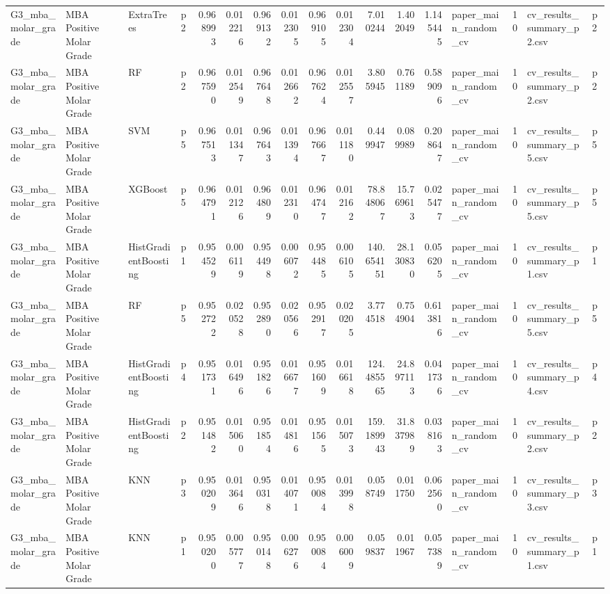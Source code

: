 \begin{tabular}{llllrrrrrrrrrlrll}
G3_mba_molar_grade & MBA Positive Molar Grade & ExtraTrees & p2 & 0.968993 & 0.012216 & 0.969132 & 0.012305 & 0.969105 & 0.012304 & 7.010244 & 1.402049 & 1.145445 & paper_main_random_cv & 10 & cv_results_summary_p2.csv & p2 \\
G3_mba_molar_grade & MBA Positive Molar Grade & RF & p2 & 0.967590 & 0.012549 & 0.967648 & 0.012662 & 0.967624 & 0.012557 & 3.805945 & 0.761189 & 0.589096 & paper_main_random_cv & 10 & cv_results_summary_p2.csv & p2 \\
G3_mba_molar_grade & MBA Positive Molar Grade & SVM & p5 & 0.967513 & 0.011347 & 0.967643 & 0.011394 & 0.967667 & 0.011180 & 0.449947 & 0.089989 & 0.208647 & paper_main_random_cv & 10 & cv_results_summary_p5.csv & p5 \\
G3_mba_molar_grade & MBA Positive Molar Grade & XGBoost & p5 & 0.964791 & 0.012126 & 0.964809 & 0.012310 & 0.964747 & 0.012162 & 78.848067 & 15.769613 & 0.025477 & paper_main_random_cv & 10 & cv_results_summary_p5.csv & p5 \\
G3_mba_molar_grade & MBA Positive Molar Grade & HistGradientBoosting & p1 & 0.954529 & 0.006119 & 0.954498 & 0.006072 & 0.954485 & 0.006105 & 140.654151 & 28.130830 & 0.056205 & paper_main_random_cv & 10 & cv_results_summary_p1.csv & p1 \\
G3_mba_molar_grade & MBA Positive Molar Grade & RF & p5 & 0.952722 & 0.020528 & 0.952890 & 0.020566 & 0.952917 & 0.020205 & 3.774518 & 0.754904 & 0.613816 & paper_main_random_cv & 10 & cv_results_summary_p5.csv & p5 \\
G3_mba_molar_grade & MBA Positive Molar Grade & HistGradientBoosting & p4 & 0.951731 & 0.016496 & 0.951826 & 0.016677 & 0.951609 & 0.016618 & 124.485565 & 24.897113 & 0.041736 & paper_main_random_cv & 10 & cv_results_summary_p4.csv & p4 \\
G3_mba_molar_grade & MBA Positive Molar Grade & HistGradientBoosting & p2 & 0.951482 & 0.015060 & 0.951854 & 0.014816 & 0.951565 & 0.015073 & 159.189943 & 31.837989 & 0.038163 & paper_main_random_cv & 10 & cv_results_summary_p2.csv & p2 \\
G3_mba_molar_grade & MBA Positive Molar Grade & KNN & p3 & 0.950209 & 0.013646 & 0.950318 & 0.014071 & 0.950084 & 0.013998 & 0.058749 & 0.011750 & 0.062560 & paper_main_random_cv & 10 & cv_results_summary_p3.csv & p3 \\
G3_mba_molar_grade & MBA Positive Molar Grade & KNN & p1 & 0.950200 & 0.005777 & 0.950148 & 0.006276 & 0.950084 & 0.006009 & 0.059837 & 0.011967 & 0.057389 & paper_main_random_cv & 10 & cv_results_summary_p1.csv & p1 \\

\end{tabular}
